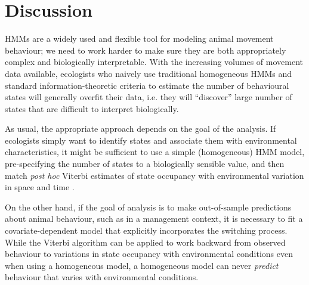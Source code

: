 \documentclass{bmcart}
\begin{document}
\section*{Discussion}

HMMs are a widely used and flexible tool for modeling animal movement
behaviour; we need to work harder to make sure they are both appropriately
complex and biologically interpretable. 
With the increasing volumes of movement data available,
ecologists who naively use traditional homogeneous HMMs
and standard information-theoretic criteria
to estimate the number of behavioural states will generally
overfit their data, i.e. they will ``discover'' large
number of states that are difficult to interpret biologically.

As usual, the appropriate approach depends on the goal of the
analysis.  If ecologists simply want to identify states
and associate them with environmental characteristics, it might be
sufficient to use a simple (homogeneous) HMM model, pre-specifying the
number of states to a biologically sensible value, and then match
\emph{post hoc} Viterbi estimates of state occupancy with
environmental variation in space and time \cite{fryxell_multiple_2008}.  


On the other hand, if the goal of analysis is to make out-of-sample
predictions about animal behaviour, such as in a management context,
it is necessary to fit a covariate-dependent model that
explicitly incorporates the switching process.
While the Viterbi algorithm can be applied to
work backward from observed behaviour
to variations in state occupancy with environmental conditions
even when using a homogeneous model,
a homogeneous model 
can never \emph{predict} behaviour that varies 
with environmental conditions.
\end{document}
